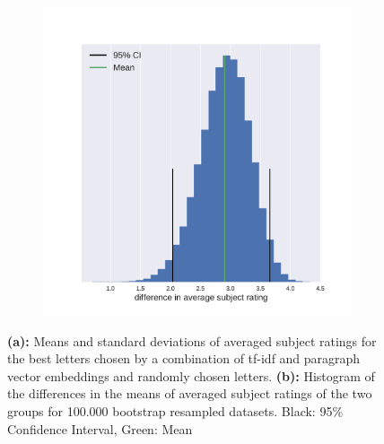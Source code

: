 \begin{figure}
\begin{subfigure}[b]{0.33\textwidth}
	\end{subfigure}
	\hfill
	\begin{subfigure}[b]{0.66\textwidth}
		\includegraphics[width=\textwidth, valign=t]{figures/mean_diff_best_random_pv}
		\caption{}
		\label{fig:bootstrap_diff_pv}
	\end{subfigure}
	\caption{\textbf{(a):} Means and standard deviations of averaged subject ratings for the best letters chosen by a combination of tf-idf and paragraph vector embeddings and randomly chosen letters.
		\textbf{(b):} Histogram of the differences in the means of averaged subject ratings of the two groups for 100.000 bootstrap resampled datasets. Black: 95\% Confidence Interval, Green: Mean}	
\end{figure}

